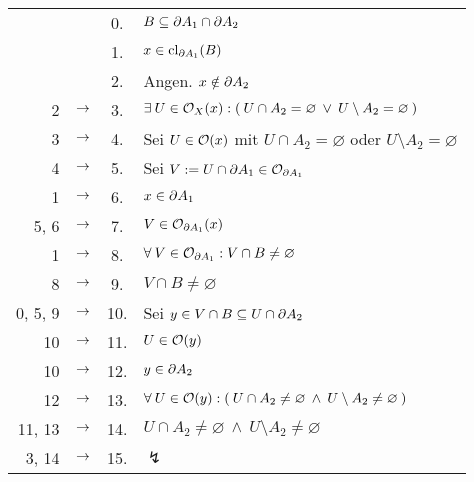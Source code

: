     \begin{longtable}{r c c l}
        & & 0. & $B \subseteq \partial A_1 \cap \partial A_2$\\
        & & 1. & $x \in \text{cl}_{\partial A_1}(B)$ \\
        & & 2. & Angen. $x \notin \partial A_2$ \\
        2 & $\rightarrow$ & 3. & $\exists\: U \in \mathcal{O}_X(x) : (\: U \cap A_2 = \varnothing \:\lor\: U \setminus A_2 = \varnothing \:)$ \\
        3 & $\rightarrow$ & 4. & Sei $U \in \mathcal{O}(x)$ mit $U \cap A_2 = \varnothing$ oder $U \setminus A_2 = \varnothing$ \\
        4 & $\rightarrow$ & 5. & Sei $V := U \cap \partial A_1 \in \mathcal{O}_{\partial A_1}$ \\
        1 & $\rightarrow$ & 6. & $x \in \partial A_1$ \\
        5, 6 & $\rightarrow$ & 7. & $V \in \mathcal{O}_{\partial A_1}(x)$ \\
        1 & $\rightarrow$ & 8. & $\forall\: V \in \mathcal{O}_{\partial A_1}: V \cap B \neq \varnothing$ \\
        8 & $\rightarrow$ & 9. & $V \cap B \neq \varnothing$ \\
        0, 5, 9 & $\rightarrow$ & 10. & Sei $y \in V \cap B \subseteq U \cap \partial A_2$ \\
        10 & $\rightarrow$ & 11. & $U \in \mathcal{O}(y)$ \\
        10 & $\rightarrow$ & 12. & $y \in \partial A_2$ \\
        12 & $\rightarrow$ & 13. & $\forall\: U \in \mathcal{O}(y) : (\: U \cap A_2 \neq \varnothing \:\land\: U \setminus A_2 \neq \varnothing \:)$ \\
        11, 13 & $\rightarrow$ & 14. & $U \cap A_2 \neq \varnothing \:\land\: U \setminus A_2 \neq \varnothing$ \\
        3, 14 & $\rightarrow$ & 15. & $\lightning$
    \end{longtable}
    
    

